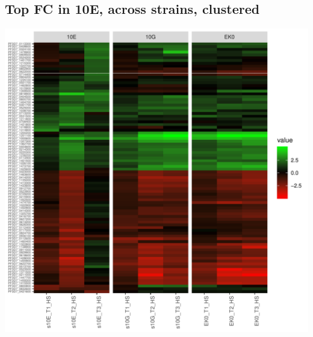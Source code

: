 \documentclass{article}\usepackage[]{graphicx}\usepackage[]{color}
\newenvironment{knitrout}{}{} %
\begin{document}
\subsection{Top FC in 10E, across strains, clustered}
\begin{knitrout}
\color{fgcolor}

{\centering \includegraphics[width=1\linewidth]{figure/minimal-heatmap_all_10E_clustered-1} 

}



\end{knitrout}
\clearpage
\end{document}
